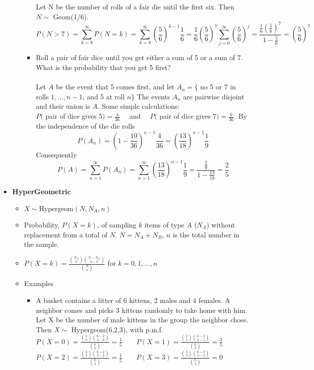 \documentclass{report}
\begin{document}
\begin{itemize}
\begin{itemize}
\begin{itemize}
          Let N be the number of rolls of a fair die until the first six. Then $N \sim$ Geom(1/6).
      \[
          P(N>7) = \sum_{k=8}^{\infty} P(N=k)
          = \sum_{k=8}^{\infty}(\frac{5}{6})^{k-1} \frac{1}{6}
          =\frac{1}{6} (\frac{5}{6}) ^7 \sum_{j=0}^{\infty}(\frac{5}{6})^j
          =\frac{\frac{1}{6} (\frac{5}{6} )^7}{1-\frac{5}{6}}
          =(\frac{5}{6})^7
        \]
    \item Roll a pair of fair dice until you get either a sum of 5 or a sum of 7. What is the probability that you get 5 first?\\\\
      Let $A$ be the event that 5 comes first, and let
      $A_n=\{$ no 5 or 7 in rolls $1, \ldots, n-1$, and 5 at roll $n\}$
      The events $A_n$ are pairwise disjoint and their union is $A$. Some simple calculations:\\
      $P($ pair of dice gives 5$)=\frac{4}{36} \quad$ and $\quad P($ pair of dice gives 7$)=\frac{6}{36}$.
      By the independence of the die rolls
      $$
      P\left(A_n\right)=\left(1-\frac{10}{36}\right)^{n-1} \frac{4}{36}=\left(\frac{13}{18}\right)^{n-1} \frac{1}{9}
      $$
      Consequently
      \[
        P(A)=\sum_{n=1}^{\infty} P\left(A_n\right)
            =\sum_{n=1}^{\infty}\left(\frac{13}{18}\right)^{n-1} \frac{1}{9}
            =\frac{\frac{1}{9}}{1-\frac{13}{18}}
            =\frac{2}{5}
      \]
      \end{itemize}
    \end{itemize}
  \item \textbf{HyperGeometric}
    \begin{itemize}
    \item $X \sim \text{Hypergeom}(N, N_A, n)$
    \item Probability, $P(X = k)$, of sampling $k$ items of type $A$ ($N_A$)
      without replacement from a total of $N$.  $N = N_A + N_B$, $n$ is the total number 
      in the sample.
    \item $P(X = k) = \frac{ \binom{N_A}{k} \binom{N - N_A}{n -k} }{ \binom{N}{n} }$ for $k = 0,1, \dots,n$
    \item Examples
      \begin{itemize}
        \item A basket contains a litter of 6 kittens, 2 males and 4 females.
          A neighbor comes and picks 3 kittens randomly to take home with him. Let
          X be the number of male kittens in the group the neighbor chose.
          Then $X \sim$ Hypergeom(6,2,3), with p.m.f.\\
         $P(X = 0) = \frac{ \binom{2}{0} \binom{6 - 2}{3 - 0} }{ \binom{6}{3} } = \frac{1}{5}
         \qquad
          P(X = 1) = \frac{ \binom{2}{1} \binom{6 - 2}{3 - 1} }{ \binom{6}{3} } = \frac{3}{5}$\\
         $P(X = 2) = \frac{ \binom{2}{2} \binom{6 - 2}{3 - 2} }{ \binom{6}{3} } = \frac{1}{5}
         \qquad
          P(X = 3) = \frac{ \binom{3}{3} \binom{6 - 3}{3 - 3} }{ \binom{6}{3} } = 0$
      \end{itemize}
    \end{itemize}
  \end{itemize}
\end{document}
